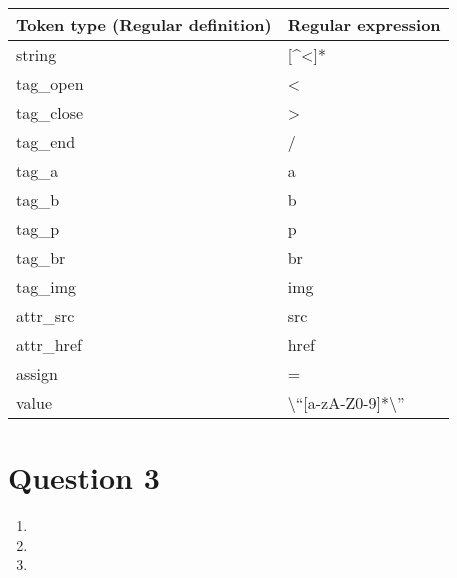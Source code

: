 \documentclass[10pt]{article}
\begin{document}
\begin{table}[H]
\centering
\begin{tabular}{ll}
\bfseries  Token type (Regular definition)  & \bfseries  Regular expression             \\
\hline
 string      &  [\^{}<]*             \\
 tag\_open    &  <                 \\
 tag\_close   &  >                 \\
 tag\_end     &  /                 \\
 tag\_a       &  a                 \\
 tag\_b       &  b                 \\
 tag\_p       &  p                 \\
 tag\_br      &  br                \\
 tag\_img     &  img               \\
 attr\_src    &  src               \\
 attr\_href   &  href              \\
 assign      &  =                 \\
 value       &  \textbackslash``[a-zA-Z0-9]*\textbackslash''  \\
\end{tabular}
\end{table}


\section*{Question 3}
\begin{enumerate}[label=\bfseries (\alph*)]

\item {}

\item {}

\item {}

\end{enumerate}
\end{document}
